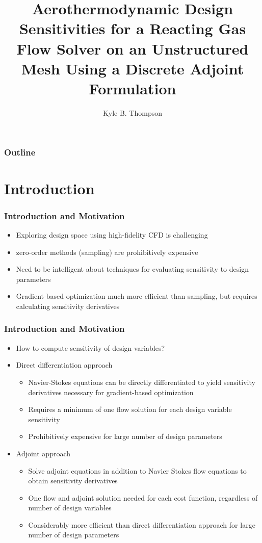 \documentclass{beamer}
\title{Aerothermodynamic Design Sensitivities for a Reacting Gas Flow Solver
  on an Unstructured Mesh Using a Discrete Adjoint Formulation}
\author{ Kyle B. Thompson }
\begin{document}
\begin{frame}
  \titlepage
\end{frame}
\begin{frame}
  \frametitle{Outline}
  \tableofcontents
\end{frame}
\section{Introduction}
\begin{frame}
  \frametitle{Introduction and Motivation}
  \begin{itemize}
    \item Exploring design space using high-fidelity CFD is challenging
    \item zero-order methods (sampling) are prohibitively expensive
    \item Need to be intelligent about techniques for evaluating sensitivity to
      design parameters
    \item Gradient-based optimization much more efficient than sampling, but
      requires calculating sensitivity derivatives
  \end{itemize}
\end{frame}
\begin{frame}
  \frametitle{Introduction and Motivation}
  \begin{itemize}
    \item How to compute sensitivity of design variables?
    \item Direct differentiation approach
      \begin{itemize}
        \item Navier-Stokes equations can be directly differentiated to yield
          sensitivity derivatives necessary for gradient-based optimization
        \item Requires a minimum of one flow solution for each design variable
          sensitivity
        \item Prohibitively expensive for large number of design parameters
      \end{itemize}
  \item Adjoint approach
    \begin{itemize}
      \item Solve adjoint equations in addition to Navier Stokes flow equations to
        obtain sensitivity derivatives
      \item One flow and adjoint solution needed for each cost function,
        regardless of number of design variables
      \item Considerably more efficient than direct differentiation approach for
        large number of design parameters
    \end{itemize}
  \end{itemize}
\end{frame}
\end{document}
